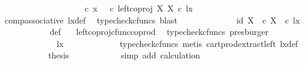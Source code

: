 \begin{isabellebody}
\ \ \ \ \ \ \isamarkupfalse%
\ {\isacharminus}{\kern0pt}\ \isanewline
\ \ \ \ \ \ \ \ \isamarkupfalse%
\ {\isachardoublequoteopen}{\isasymrho}\ {\isasymcirc}\isactrlsub c\ x\ {\isacharequal}{\kern0pt}\ {\isacharparenleft}{\kern0pt}{\isasymrho}\ {\isasymcirc}\isactrlsub c\ left{\isacharunderscore}{\kern0pt}coproj\ X\ X{\isacharparenright}{\kern0pt}\ {\isasymcirc}\isactrlsub c\ lx{\isachardoublequoteclose}\isanewline
\ \ \ \ \ \ \ \ \ \ \isamarkupfalse%
\ comp{\isacharunderscore}{\kern0pt}associative{}\ lx{\isacharunderscore}{\kern0pt}def\ \isamarkupfalse%
\ {\isacharparenleft}{\kern0pt}typecheck{\isacharunderscore}{\kern0pt}cfuncs{\isacharcomma}{\kern0pt}\ blast{\isacharparenright}{\kern0pt}\isanewline
\ \ \ \ \ \ \ \ \isamarkupfalse%
\ \isamarkupfalse%
\ {\isachardoublequoteopen}{\isachardot}{\kern0pt}{\isachardot}{\kern0pt}{\isachardot}{\kern0pt}\ {\isacharequal}{\kern0pt}\ {\isasymlangle}id\ X{\isacharcomma}{\kern0pt}\ {\isasymt}\ {\isasymcirc}\isactrlsub c\ {\isasymbeta}\isactrlbsub X\isactrlesub {\isasymrangle}\ \ {\isasymcirc}\isactrlsub c\ lx{\isachardoublequoteclose}\isanewline
\ \ \ \ \ \ \ \ \ \ \isamarkupfalse%
\ {\isasymrho}{\isacharunderscore}{\kern0pt}def\ \ \isamarkupfalse%
\ left{\isacharunderscore}{\kern0pt}coproj{\isacharunderscore}{\kern0pt}cfunc{\isacharunderscore}{\kern0pt}coprod\ \isamarkupfalse%
\ {\isacharparenleft}{\kern0pt}typecheck{\isacharunderscore}{\kern0pt}cfuncs{\isacharcomma}{\kern0pt}\ presburger{\isacharparenright}{\kern0pt}\isanewline
\ \ \ \ \ \ \ \ \isamarkupfalse%
\ \isamarkupfalse%
\ {\isachardoublequoteopen}{\isachardot}{\kern0pt}{\isachardot}{\kern0pt}{\isachardot}{\kern0pt}\ {\isacharequal}{\kern0pt}\ {\isasymlangle}lx{\isacharcomma}{\kern0pt}\ {\isasymt}{\isasymrangle}{\isachardoublequoteclose}\isanewline
\ \ \ \ \ \ \ \ \ \ \isamarkupfalse%
\ {\isacharparenleft}{\kern0pt}typecheck{\isacharunderscore}{\kern0pt}cfuncs{\isacharcomma}{\kern0pt}\ metis\ cart{\isacharunderscore}{\kern0pt}prod{\isacharunderscore}{\kern0pt}extract{\isacharunderscore}{\kern0pt}left\ lx{\isacharunderscore}{\kern0pt}def{\isacharparenright}{\kern0pt}\isanewline
\ \ \ \ \ \ \ \ \isamarkupfalse%
\ \isamarkupfalse%
\ {\isacharquery}{\kern0pt}thesis\isanewline
\ \ \ \ \ \ \ \ \ \ \isamarkupfalse%
\ {\isacharparenleft}{\kern0pt}simp\ add{\isacharcolon}{\kern0pt}\ calculation{\isacharparenright}{\kern0pt}\isanewline

\end{isabellebody}
